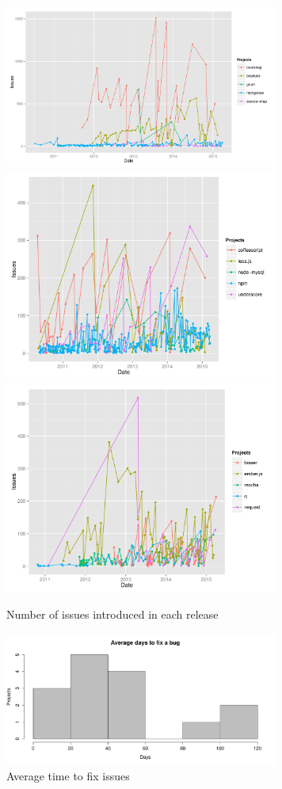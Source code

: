 \begin{figure}[thb!]
	\caption{Number of issues introduced in each release}
	\label{fig:number_of_issues}
	\includegraphics[width=90mm,scale=0.5]{figures/issues_per_release}
	\includegraphics[width=90mm,scale=0.5]{figures/issues_per_release_2}
	\includegraphics[width=90mm,scale=0.5]{figures/issues_per_release_3}
\end{figure}
 
\begin{figure}[thb!]
	\caption{Average time to fix issues}
	\label{fig:avg_issue_fix}
	\includegraphics[width=90mm,scale=0.5]{figures/average_days_to_fix_bugs}

\end{figure}


